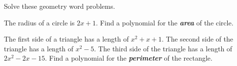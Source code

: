 \begin{myProblemsWithContent}{2}{Solve these geometry word problems.}
    \begin{tcolorbox}
        The radius of a circle is $2x + 1$.
        Find a polynomial for the {\bfseries\itshape area} of the circle.
        \vspace{4.5in}
    \end{tcolorbox}
    \begin{tcolorbox}
        The first side of a triangle has a length of  $x^2 + x + 1$.
        The second side of the triangle has a length of $x^2-5$.
        The third side of the triangle has a length of $2x^2 - 2x - 15$.
        Find a polynomial for the {\bfseries\itshape perimeter} of the rectangle.
    \end{tcolorbox}
\end{myProblemsWithContent}

